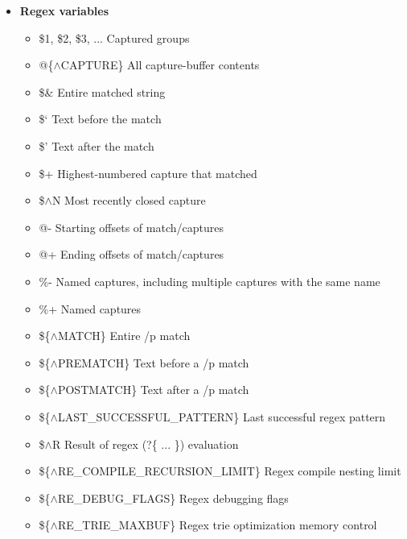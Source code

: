 \documentclass{report}
\begin{document}
\begin{itemize}
\begin{itemize}
                \item \%SIG	Signal handlers
                \item \%\{$\land$HOOK\}	Hooks for certain Perl operations
                \item \$\{$\land$MAX\_NESTED\_EVAL\_BEGIN\_BLOCKS\}	Limit for nested eval/BEGIN processing
            \end{itemize}
        \item \textbf{Regex variables}
            \begin{itemize}
                \item \$1, \$2, \$3, ...	Captured groups
                \item @\{$\land$CAPTURE\}	All capture-buffer contents
                \item \$\&	Entire matched string
                \item \$`	Text before the match
                \item \$'	Text after the match
                \item \$+	Highest-numbered capture that matched
                \item \$$\land$N	Most recently closed capture
                \item @-	Starting offsets of match/captures
                \item @+	Ending offsets of match/captures
                \item \%-	Named captures, including multiple captures with the same name
                \item \%+	Named captures
                \item \$\{$\land$MATCH\}	Entire /p match
                \item \$\{$\land$PREMATCH\}	Text before a /p match
                \item \$\{$\land$POSTMATCH\}	Text after a /p match
                \item \$\{$\land$LAST\_SUCCESSFUL\_PATTERN\}	Last successful regex pattern
                \item \$$\land$R	Result of regex (?\{ ... \}) evaluation
                \item \$\{$\land$RE\_COMPILE\_RECURSION\_LIMIT\}	Regex compile nesting limit
                \item \$\{$\land$RE\_DEBUG\_FLAGS\}	Regex debugging flags
                \item \$\{$\land$RE\_TRIE\_MAXBUF\}	Regex trie optimization memory control
            \end{itemize}

\end{itemize}
\end{document}
